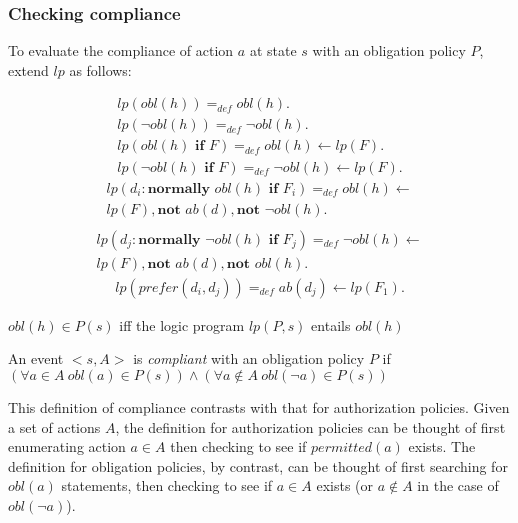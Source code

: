 \subsubsection{Checking compliance}

To evaluate the compliance of action $a$ at state $s$ with an obligation policy $P$, \citet{gelfond_authorization_2008} extend $lp$ as follows:

\begin{gather}
    lp(obl(h)) =_{def}
        obl(h). \\
    lp(\neg obl(h)) =_{def}
        \neg obl(h). \\
    lp(obl(h) \textbf{ if } F) =_{def}
        obl(h) \leftarrow
            lp(F). \\
    lp(\neg obl(h) \textbf{ if } F) =_{def}
        \neg obl(h) \leftarrow
            lp(F).
\end{gather}
\begin{multline}
    lp(d_i: \textbf{normally } obl(h) \textbf{ if } F_i) =_{def}
        obl(h) \leftarrow \\
            lp(F),
            \textbf{not } ab(d),
            \textbf{not } \neg obl(h). \\
\end{multline}
\begin{multline}
    lp(d_j: \textbf{normally } \neg obl(h) \textbf{ if } F_j) =_{def}
        \neg obl(h) \leftarrow \\
            lp(F),
            \textbf{not } ab(d),
            \textbf{not } obl(h).
\end{multline}
\begin{gather}
    lp(prefer(d_i, d_j)) =_{def}
        ab(d_j) \leftarrow lp(F_1).
\end{gather}

\begin{definition}
    $obl(h) \in P(s)$ iff the logic program $lp(P, s)$ entails $obl(h)$
\end{definition}

\begin{definition}
    An event $<s, A>$ is \textit{compliant} with an obligation policy $P$ if $(\forall a \in A \ obl(a) \in P(s)) \land (\forall a \not \in A \ obl(\neg a) \in P(s))$
\end{definition}

This definition of compliance contrasts with that for authorization policies.
Given a set of actions $A$, the definition for authorization policies can be thought of first enumerating action $a \in A$ then checking to see if $permitted(a)$ exists.
The definition for obligation policies, by contrast, can be thought of first searching for $obl(a)$ statements, then checking to see if $a \in A$ exists (or $a \not \in A$ in the case of $obl(\neg a)$).

